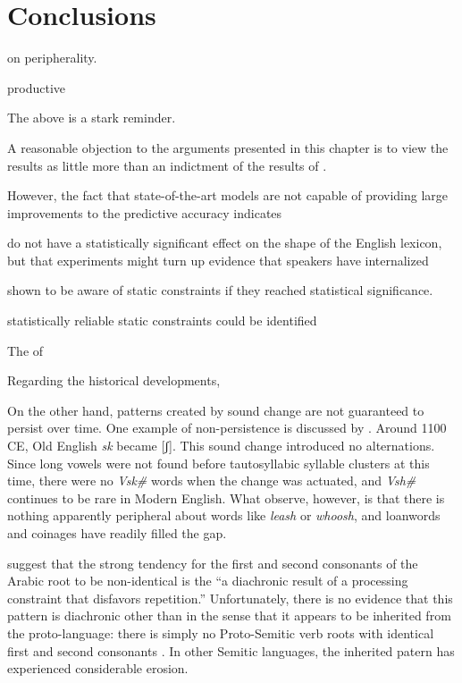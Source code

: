
\section{Conclusions}

\citet{Borowsky1989} on peripherality.

productive \citet{Duanmu2008}

The above is a stark reminder.


A reasonable objection to the arguments presented in this chapter is to view the results as little more than an indictment of the results of \citealt{Pierrehumbert1994}.

However, the fact that state-of-the-art models are not capable of providing large improvements to the predictive accuracy indicates


 do not have a statistically significant effect on the shape of the English lexicon, but that experiments might turn up evidence that speakers have internalized 


shown to be aware of static constraints if they reached statistical significance. 



 statistically reliable static constraints could be identified 

The of


Regarding the historical developments,

\citet{Martin2007}

On the other hand, patterns created by sound change are not guaranteed to persist over time. One example of non-persistence is discussed by \citet{Iverson2005}. Around 1100 CE, Old English \emph{sk} became [ʃ]. This sound change introduced no alternations. Since long vowels were not found before tautosyllabic syllable clusters at this time, there were no \emph{V\lm sk\#} words when the change was actuated, and \emph{V\lm sh\#} continues to be rare in Modern English. What \citeauthor{Iverson2005} observe, however, is that there is nothing apparently peripheral about words like \emph{leash} or \emph{whoosh}, and loanwords and coinages have readily filled the gap.

\citet[][140]{Frisch2004} suggest that the strong tendency for the first and second consonants of the Arabic root to be non-identical is the ``a diachronic result of a processing constraint that disfavors repetition.'' Unfortunately, there is no evidence that this pattern is diachronic other than in the sense that it appears to be inherited from the proto-language: there is simply no Proto-Semitic verb roots with identical first and second consonants \citep[][178]{Greenberg1950}. In other Semitic languages, the inherited patern has experienced considerable erosion. 

